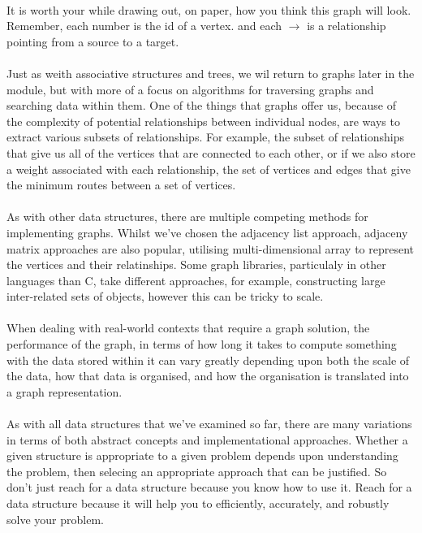 \documentclass[10pt, a4paper, twosize]{article}
\begin{document}
\paragraph{} It is worth your while drawing out, on paper, how you think this graph will look. Remember, each number is the id of a vertex. and each $\to$ is a relationship pointing from a source to a target.

\paragraph{} Just as weith associative structures and trees, we wil return to graphs later in the module, but with more of a focus on algorithms for traversing graphs and searching data within them. One of the things that graphs offer us, because of the complexity of potential relationships between individual nodes, are ways to extract various subsets of relationships. For example, the subset of relationships that give us all of the vertices that are connected to each other, or if we also store a weight associated with each relationship, the set of vertices and edges that give the minimum routes between a set of vertices.

\paragraph{} As with other data structures, there are multiple competing methods for implementing graphs. Whilst we've chosen the adjacency list approach, adjaceny matrix approaches are also popular, utilising multi-dimensional array to represent the vertices and their relatinships. Some graph libraries, particulaly in other languages than C, take different approaches, for example, constructing large inter-related sets of objects, however this can be tricky to scale.

\paragraph{} When dealing with real-world contexts that require a graph solution, the performance of the graph, in terms of how long it takes to compute something with the data stored within it can vary greatly depending upon both the scale of the data, how that data is organised, and how the organisation is translated into a graph representation. 

\paragraph{} As with all data structures that we've examined so far, there are many variations in terms of both abstract concepts and implementational approaches. Whether a given structure is appropriate to a given problem depends upon understanding the problem, then selecing an appropriate approach that can be justified. So don't just reach for a data structure because you know how to use it. Reach for a data structure because it will help you to efficiently, accurately, and robustly solve your problem.
\end{document}
